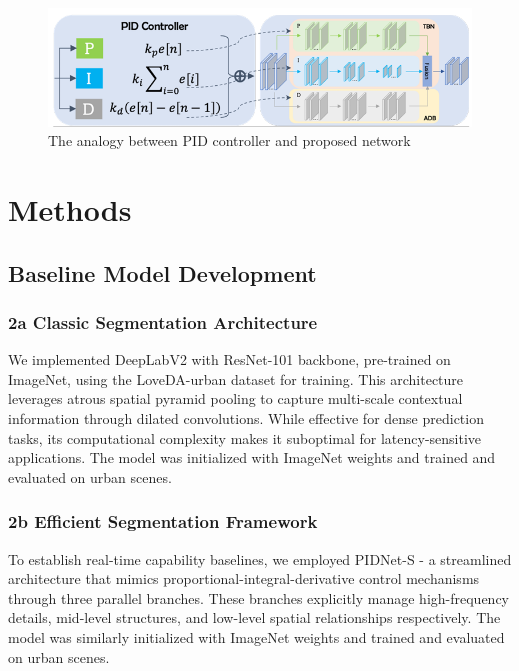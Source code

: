 \documentclass{article}
\begin{document}
\begin{multicols}{2}
		\begin{figure}[H]
			\centering
			\includegraphics[width=1\linewidth]{image/PIDNET.png}
			\caption{ The analogy between PID controller and proposed network}
			\label{fig:PIDNET_image}
		\end{figure}		
		
\section{Methods}
\subsection{Baseline Model Development}
\subsubsection{2a Classic Segmentation Architecture } 
We implemented DeepLabV2  \cite{chen2018deeplab}  with ResNet-101 backbone, pre-trained on ImageNet, using the LoveDA-urban dataset for training. This architecture leverages atrous spatial pyramid pooling to capture multi-scale contextual information through dilated convolutions. While effective for dense prediction tasks, its computational complexity makes it suboptimal for latency-sensitive applications. The model was initialized with ImageNet weights and trained and evaluated on urban scenes.

\subsubsection{2b Efficient Segmentation Framework}
To establish real-time capability baselines, we employed PIDNet-S - a streamlined architecture that mimics proportional-integral-derivative control mechanisms through three parallel branches. These branches explicitly manage high-frequency details, mid-level structures, and low-level spatial relationships respectively. The model was similarly initialized with ImageNet weights and trained and evaluated on urban scenes.

\end{multicols}
\end{document}
